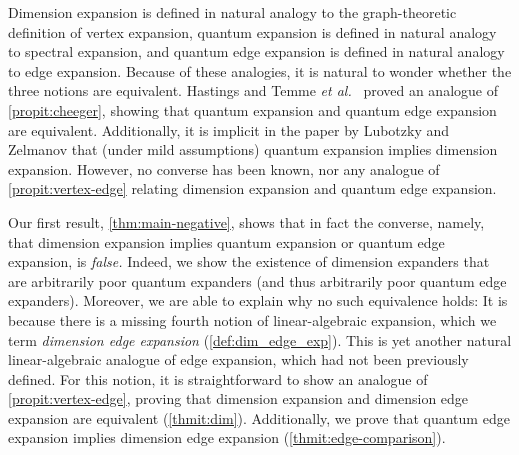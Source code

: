 \documentclass[11pt]{article}
\theoremstyle{plain}
\numberwithin{equation}{section}
\theoremstyle{definition}
\begin{document}
Dimension expansion is defined in natural analogy to the graph-theoretic definition of vertex expansion, quantum expansion is defined in natural analogy to spectral expansion, and quantum edge expansion is defined in natural analogy to edge expansion. Because of these analogies, it is natural to wonder whether the three notions are equivalent. Hastings \cite{PhysRevA.76.032315} and Temme \emph{et al.}~\cite{10.1063/1.3511335} proved an analogue of \cref{propit:cheeger}, showing that quantum expansion and quantum edge expansion are equivalent. Additionally, it is implicit in %
the paper by %
Lubotzky and Zelmanov \cite{LUBOTZKY2008730} that (under mild assumptions) quantum expansion implies dimension expansion. However, no %
converse  %
%
%
has been known,  %
nor any analogue of \cref{propit:vertex-edge} relating dimension expansion and 
quantum edge expansion.

%
%
%
%
%
Our first result,
\cref{thm:main-negative},   %
%
%
shows that in fact the %
converse,  %
namely,
that  %
dimension expansion implies quantum expansion or quantum edge expansion, is \emph{false.}
%
Indeed, we show the %
existence  %
of dimension expanders that are arbitrarily poor quantum expanders (and thus arbitrarily poor quantum edge expanders). Moreover, we are able to explain 
%
why 
%
no such equivalence holds: It is because there is a 
%
missing 
%
fourth notion of linear-algebraic expansion, which we term \emph{dimension edge expansion}
%
(\cref{def:dim_edge_exp}). 
%
This is yet another natural linear-algebraic analogue of edge expansion, which had not been previously defined. For this notion, it is straightforward to show an analogue of \cref{propit:vertex-edge}, proving that dimension expansion and dimension edge expansion are equivalent 
%
(\cref{thmit:dim}). 
%
Additionally, we prove that quantum edge expansion implies dimension edge expansion
%
(\cref{thmit:edge-comparison}). 
%
\end{document}
